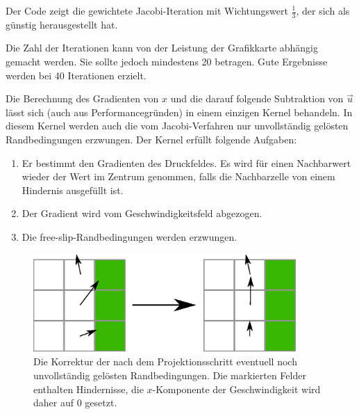 Der Code zeigt die gewichtete Jacobi-Iteration mit Wichtungswert
$\frac{1}{3}$, der sich als günstig herausgestellt hat.

Die Zahl der Iterationen kann von der Leistung der Grafikkarte
abhängig gemacht werden. Sie sollte jedoch mindestens 20
betragen. Gute Ergebnisse werden bei 40 Iterationen
erzielt.

Die Berechnung des Gradienten von $x$ und die darauf folgende
Subtraktion von $\vec{u}$ lässt sich (auch aus Performancegründen) in
einem einzigen Kernel behandeln. In diesem Kernel werden auch die vom
Jacobi-Verfahren nur unvollständig gelösten Randbedingungen
erzwungen. Der Kernel erfüllt folgende Aufgaben:

\begin{enumerate}
\item Er bestimmt den Gradienten des Druckfeldes. Es wird für einen
Nachbarwert wieder der Wert im Zentrum genommen, falls die
Nachbarzelle von einem Hindernis ausgefüllt ist.
\item Der Gradient wird vom Geschwindigkeitsfeld abgezogen.
\item Die free-slip-Randbedingungen werden erzwungen.
\end{enumerate}

\begin{figure}[h]
\centering
\includegraphics[width=10cm]{images/force_free_slip}
\caption{Die Korrektur der nach dem Projektionsschritt eventuell noch unvollständig gelösten Randbedingungen. Die markierten Felder enthalten Hindernisse, die $x$-Komponente der Geschwindigkeit wird daher auf $0$ gesetzt.}
\label{fig:implementation_wind_enforce_free_slip}
\end{figure}

